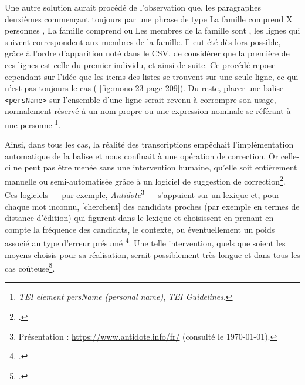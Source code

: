 \bigbreak

Une autre solution aurait procédé de l'observation que, les paragraphes deuxièmes commençant toujours par une phrase de type \og La famille comprend X personnes \fg{}, \og La famille comprend \fg{} ou \og Les membres de la famille sont \fg{}, les lignes qui suivent correspondent aux membres de la famille. Il eut été dès lors possible, grâce à l'ordre d'apparition noté dans le CSV, de considérer que la première de ces lignes est celle du premier individu, et ainsi de suite. Ce procédé repose cependant sur l'idée que les items des listes se trouvent sur une seule ligne, ce qui n'est pas toujours le cas (\fig{} \ref{fig:mono-23-page-209}). Du reste, placer une balise \texttt{<persName>} sur l'ensemble d'une ligne serait revenu à corrompre son usage, normalement réservé à \og un nom propre ou une expression nominale se référant à une personne \fg{}\footnote{\textit{TEI element persName (personal name)}, \textit{TEI Guidelines}.}.

Ainsi, dans tous les cas, la réalité des transcriptions empêchait l'implémentation automatique de la balise et nous confinait à une opération de correction.  Or celle-ci ne peut pas être menée sans une intervention humaine, qu'elle soit entièrement manuelle ou semi-automatisée grâce à un logiciel de suggestion de correction\footcite[p. 1]{sagot}. Ces logiciels --- par exemple, \textit{Antidote}\footnote{Présentation : \url{https://www.antidote.info/fr/} (consulté le \today).} --- s'appuient sur un lexique et, \og pour chaque mot inconnu, [cherchent] des candidats proches (par exemple en termes de distance d’édition) qui figurent dans le lexique et choisissent en prenant en compte la fréquence des candidats, le contexte, ou éventuellement un poids associé au type d’erreur présumé \fg{}\footcite[p. 1-2]{sagot}. Une telle intervention, quels que soient les moyens choisis pour sa réalisation, serait possiblement très longue et dans tous les cas coûteuse\footcite[p. 14]{en-tal}.


